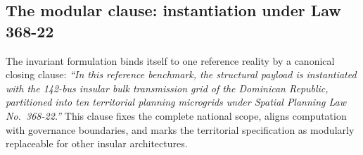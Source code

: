 \subsection{The modular clause: instantiation under Law 368-22}
\label{sub:modular}

The invariant formulation binds itself to one reference reality by a canonical closing clause: \emph{``In this reference benchmark, the structural payload is instantiated with the 142-bus insular bulk transmission grid of the Dominican Republic, partitioned into ten territorial planning microgrids under Spatial Planning Law No.~368-22.''} This clause fixes the complete national scope, aligns computation with governance boundaries, and marks the territorial specification as modularly replaceable for other insular architectures.
